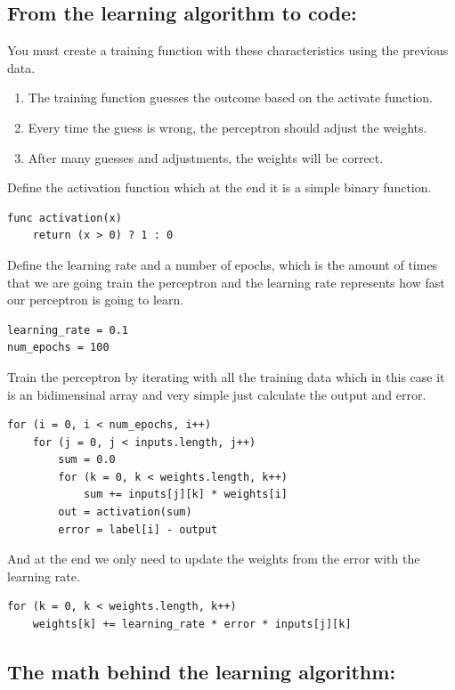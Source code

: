 \documentclass[12pt]{article}
\begin{document}
\subsection{From the learning algorithm to code:}
You must create a training function with these characteristics using the previous data.
\begin{enumerate}
\item The training function guesses the outcome based on the activate function.
\item Every time the guess is wrong, the perceptron should adjust the weights.
\item After many guesses and adjustments, the weights will be correct.
\end{enumerate}
Define the activation function which at the end it is a simple binary function.
\begin{verbatim}
func activation(x)
    return (x > 0) ? 1 : 0
\end{verbatim}
Define the learning rate and a number of epochs, which is the amount of times that we are going
train the perceptron and the learning rate represents how fast our perceptron is going to learn.
\begin{verbatim}
learning_rate = 0.1
num_epochs = 100
\end{verbatim}
Train the perceptron by iterating with all the training data which in this case it is an bidimensinal
array and very simple just calculate the output and error.
\begin{verbatim}
for (i = 0, i < num_epochs, i++)
    for (j = 0, j < inputs.length, j++)
        sum = 0.0
        for (k = 0, k < weights.length, k++)
            sum += inputs[j][k] * weights[i]
        out = activation(sum)
        error = label[i] - output
\end{verbatim}
And at the end we only need to update the weights from the error with the learning rate.
\begin{verbatim}
for (k = 0, k < weights.length, k++)
    weights[k] += learning_rate * error * inputs[j][k]
\end{verbatim}
\subsection{The math behind the learning algorithm:}
\end{document}
